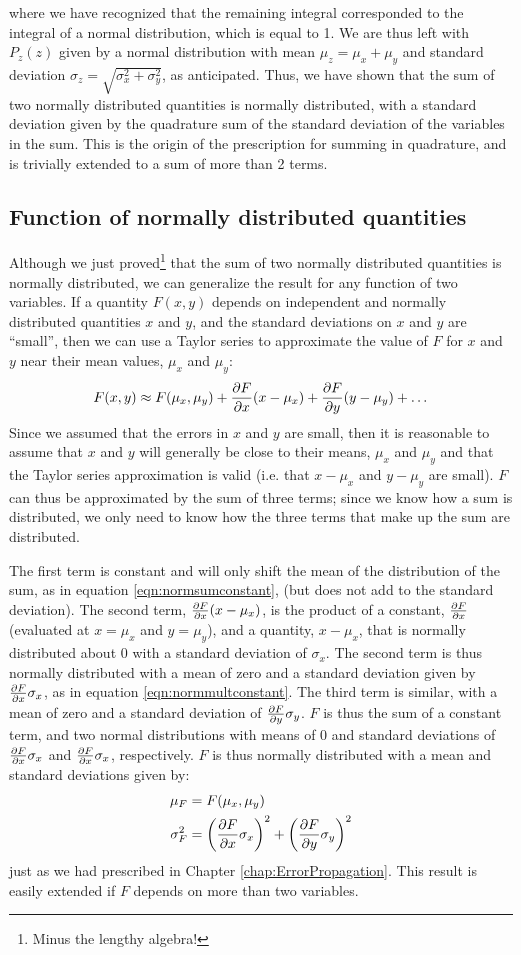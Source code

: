 where we have recognized that the remaining integral corresponded to the integral of a normal distribution, which is equal to 1. We are thus left with $P_z(z)$ given by a normal distribution with mean $\mu_z=\mu_x+\mu_y$ and standard deviation $\sigma_z=\sqrt{\sigma_x^2+\sigma_y^2}$, as anticipated. Thus, we have shown that the sum of two normally distributed quantities is normally distributed, with a standard deviation given by the quadrature sum of the standard deviation of the variables in the sum. This is the origin of the prescription for summing in quadrature, and is trivially extended to a sum of more than 2 terms.
\subsection{Function of normally distributed quantities}
Although we just proved\footnote{Minus the lengthy algebra!} that the sum of two normally distributed quantities is normally distributed, we can generalize the result for any function of two variables. If a quantity $F(x,y)$ depends on independent and normally distributed quantities $x$ and $y$, and the standard deviations on $x$ and $y$ are ``small'', then we can use a Taylor series to approximate the value of $F$ for $x$ and $y$ near their mean values, $\mu_x$ and $\mu_y$:
\begin{align*}
F(x,y) \approx F(\mu_x,\mu_y)+\frac{\partial F}{\partial x}(x-\mu_x)+\frac{\partial F}{\partial y}(y-\mu_y)+\dots
\end{align*}
Since we assumed that the errors in $x$ and $y$ are small, then it is reasonable to assume that $x$ and $y$ will generally be close to their means, $\mu_x$ and $\mu_y$ and that the Taylor series approximation is valid (i.e. that $x-\mu_x$ and $y-\mu_y$ are small). $F$ can thus be approximated by the sum of three terms; since we know how a sum is distributed, we only need to know how the three terms that make up the sum are distributed.

The first term is constant and will only shift the mean of the distribution of the sum, as in equation \ref{eqn:normsumconstant}, (but does not add to the standard deviation). The second term, $\frac{\partial F}{\partial x}(x-\mu_x)$, is the product of a constant, $\frac{\partial F}{\partial x}$ (evaluated at $x=\mu_x$ and $y=\mu_y$), and a quantity, $x-\mu_x$, that is normally distributed about 0 with a standard deviation of $\sigma_x$. The second term is thus normally distributed with a mean of zero and a standard deviation given by $\frac{\partial F}{\partial x}\sigma_x$, as in equation \ref{eqn:normmultconstant}. The third term is similar, with a mean of zero and a standard deviation of $\frac{\partial F}{\partial y}\sigma_y$. $F$ is thus the sum of a constant term, and two normal distributions with means of 0 and standard deviations of $\frac{\partial F}{\partial x}\sigma_x$ and $\frac{\partial F}{\partial x}\sigma_x$, respectively. $F$ is thus normally distributed with a mean and standard deviations given by:
\begin{align}
\label{eqn:normerror}
\mu_F &=F(\mu_x,\mu_y)\nonumber\\
\sigma_F^2&=\left(\frac{\partial F}{\partial x}\sigma_x\right)^2+\left(\frac{\partial F}{\partial y}\sigma_y\right)^2
\end{align}
just as we had prescribed in Chapter \ref{chap:ErrorPropagation}. This result is easily extended if $F$ depends on more than two variables.

